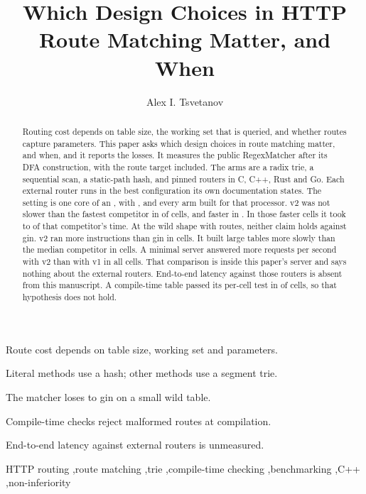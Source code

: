 \documentclass[preprint,12pt,authoryear]{elsarticle}
\newcommand{\Title}[1]{\title{#1}}
\newcommand{\orcidauthorA}{0009-0001-8369-150X}
\begin{document}
\begin{frontmatter}
\Title{Which Design Choices in HTTP Route Matching Matter, and When}

\author{Alex I. Tsvetanov}
\fntext[orcid]{ORCID \orcidauthorA.}

\begin{abstract}
Routing cost depends on table size, the working set that is queried, and whether routes capture parameters.
This paper asks which design choices in route matching matter, and when, and it reports the losses.
It measures the public RegexMatcher after its DFA construction, with the route target included.
The arms are a radix trie, a sequential scan, a static-path hash, and pinned routers in C, C++, Rust and Go.
Each external router runs in the best configuration its own documentation states.
The setting is one core of an \HostLCpu, with \RunCompiler, and every arm built for that processor.
v2 was not slower than the fastest competitor in \HOnePassed{} of \HOneCells{} cells, and faster in \HOneSuperior.
In those faster cells it took \HOneSupRatioMin{} to \HOneSupRatioMax{} of that competitor's time.
At the wild shape with \SizeTen{} routes, neither claim holds against gin.
v2 ran more instructions than gin in \HTwoLost{} cells.
It built large tables more slowly than the median competitor in \HFourLostBuild{} cells.
A minimal server answered more requests per second with v2 than with v1 in all \HSixCells{} cells.
That comparison is inside this paper's server and says nothing about the external routers.
End-to-end latency against those routers is absent from this manuscript.
A compile-time table passed its per-cell test in \HSevenHeld{} of \HSevenCells{} cells, so that hypothesis does not hold.
\end{abstract}

\begin{highlights}
\item Route cost depends on table size, working set and parameters.
\item Literal methods use a hash; other methods use a segment trie.
\item The matcher loses to gin on a small wild table.
\item Compile-time checks reject malformed routes at compilation.
\item End-to-end latency against external routers is unmeasured.
\end{highlights}

\begin{keyword}
HTTP routing \sep route matching \sep trie \sep compile-time checking \sep benchmarking \sep C++ \sep non-inferiority
\end{keyword}
\end{frontmatter}
\end{document}
